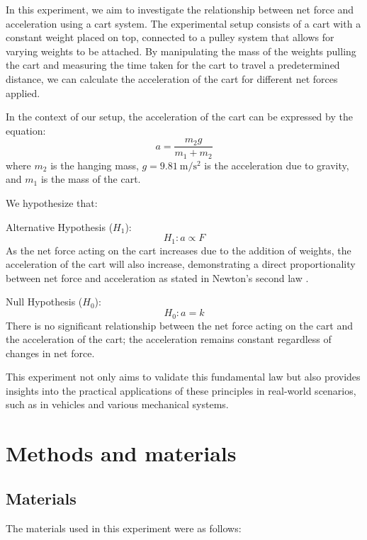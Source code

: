 ﻿\documentclass[reprint,amsmath,amssymb,aps]{revtex4-2}
\begin{document}
In this experiment, we aim to investigate the relationship between net force and acceleration using a cart system. The experimental setup consists of a cart with a constant weight placed on top, connected to a pulley system that allows for varying weights to be attached. By manipulating the mass of the weights pulling the cart and measuring the time taken for the cart to travel a predetermined distance, we can calculate the acceleration of the cart for different net forces applied.

In the context of our setup, the acceleration of the cart can be expressed by the equation:
\begin{equation}
a = \frac{m_2 g}{m_1 + m_2}
\label{eq:n2lprediction}
\end{equation}
where $m_2$ is the hanging mass, $g=\qty{9.81}{\meter\per\second\squared}$ is the acceleration due to gravity, and $m_1$ is the mass of the cart.

We hypothesize that:

Alternative Hypothesis ($H_1$): 
\begin{equation}
H_1: a \propto F
\end{equation}
As the net force acting on the cart increases due to the addition of weights, the acceleration of the cart will also increase, demonstrating a direct proportionality between net force and acceleration as stated in Newton's second law \cite{tipler}.

Null Hypothesis ($H_0$): 
\begin{equation}
H_0: a = k
\end{equation}
There is no significant relationship between the net force acting on the cart and the acceleration of the cart; the acceleration remains constant regardless of changes in net force.

This experiment not only aims to validate this fundamental law but also provides insights into the practical applications of these principles in real-world scenarios, such as in vehicles and various mechanical systems.










\section{Methods and materials}

\subsection{Materials}
The materials used in this experiment were as follows:
\end{document}
